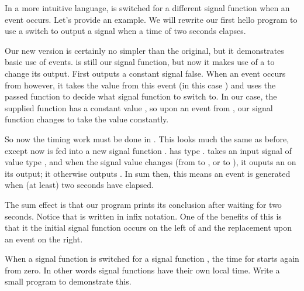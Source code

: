 In a more intuitive language,  is switched for a different signal function when an event occurs. Let's provide an example. We will rewrite our first hello program to use a switch to output a  signal when a time of two seconds elapses.



Our new version is certainly no simpler than the original, but it demonstrates basic use of events.  is still our signal function, but now it makes use of a  to change its output. First  outputs a constant signal false. When an event occurs from  however, it takes the value from this event (in this case \hask{()}) and uses the passed function to decide what signal function to switch to. In our case, the supplied function has a constant value , so upon an event from , our signal function changes to take the value  constantly.

So now the timing work must be done in . This looks much the same as before, except now  is fed into a new signal function .  has type .  takes an input signal of value type , and when the signal value changes (from  to , or  to ), it ouputs an  on its output; it otherwise outputs . In sum then, this means an event is generated when (at least) two seconds have elapsed.

The sum effect is that our program prints its conclusion after waiting for two seconds. Notice that  is written in infix notation. One of the benefits of this is that it the initial signal function occurs on the left of  and the replacement upon an event on the right.

\begin{exercise}
When a signal function  is switched for a signal function , the time for  starts again from zero. In other words signal functions have their own local time. Write a small program to demonstrate this.
\end{exercise}
